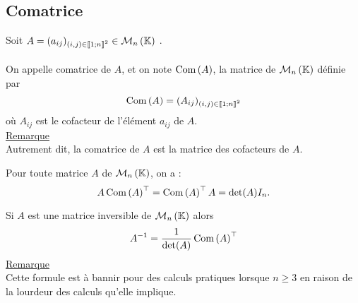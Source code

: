 \subsection{Comatrice}
\begin{defi}
    Soit \(A = (a_{ij} )_{(i,j)\in \interventierii{1}{n}^2} \in  \M{n}\) .\\~\\
    On appelle comatrice de \(A\), et on note \(\operatorname{Com}\left(A\right)\), la matrice de \(\M{n}\) définie par 
    \[\operatorname{Com}\left(A\right) = (A_{ij} )_{(i,j) \in \left\llbracket1;n\right\rrbracket^2}\]
    où \(A_{ij}\) est le cofacteur de l’élément \(a_{ij}\) de \(A\).\\
    \underline{Remarque}\\
    Autrement dit, la comatrice de \(A\) est la matrice des cofacteurs de \(A\).
\end{defi}

\begin{defprop}
    Pour toute matrice \(A\) de \(\M{n}\), on a :
    \[A \operatorname{Com}\left(A\right)^{\top} = \operatorname{Com}\left(A\right)^{\top} A = \det (A)I_n.\]
\end{defprop}
\begin{defprop}
    Si \(A\) est une matrice inversible de \(\M{n}\) alors
    \[A^{-1} = \frac{1}{\det (A)} \operatorname{Com}\left(A\right)^{\top} \]
    \underline{Remarque}\\
    Cette formule est à bannir pour des calculs pratiques lorsque \(n \geq 3\) en raison de la lourdeur des calculs qu’elle implique.
\end{defprop}